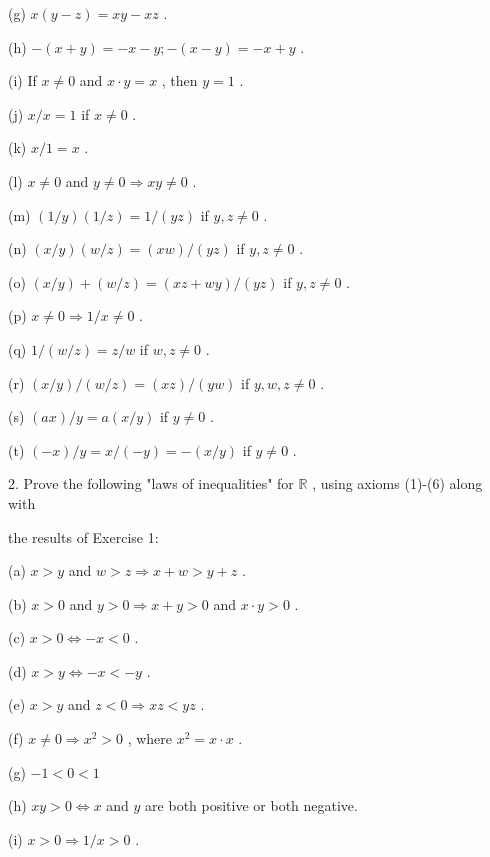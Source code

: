 (g) \(x\left( {y - z}\right)  = {xy} - {xz}\) .

(h) \(- \left( {x + y}\right)  =  - x - y; - \left( {x - y}\right)  =  - x + y\) .

(i) If \(x \neq  0\) and \(x \cdot  y = x\) , then \(y = 1\) .

(j) \(x/x = 1\) if \(x \neq  0\) .

(k) \(x/1 = x\) .

(l) \(x \neq  0\) and \(y \neq  0 \Rightarrow  {xy} \neq  0\) .

(m) \(\left( {1/y}\right) \left( {1/z}\right)  = 1/\left( {yz}\right)\) if \(y,z \neq  0\) .

(n) \(\left( {x/y}\right) \left( {w/z}\right)  = \left( {xw}\right) /\left( {yz}\right)\) if \(y,z \neq  0\) .

(o) \(\left( {x/y}\right)  + \left( {w/z}\right)  = \left( {{xz} + {wy}}\right) /\left( {yz}\right)\) if \(y,z \neq  0\) .

(p) \(x \neq  0 \Rightarrow  1/x \neq  0\) .

(q) \(1/\left( {w/z}\right)  = z/w\) if \(w,z \neq  0\) .

(r) \(\left( {x/y}\right) /\left( {w/z}\right)  = \left( {xz}\right) /\left( {yw}\right)\) if \(y,w,z \neq  0\) .

(s) \(\left( {ax}\right) /y = a\left( {x/y}\right)\) if \(y \neq  0\) .

(t) \(\left( {-x}\right) /y = x/\left( {-y}\right)  =  - \left( {x/y}\right)\) if \(y \neq  0\) .

2. Prove the following "laws of inequalities" for \(\mathbb{R}\) , using axioms (1)-(6) along with

the results of Exercise 1:

(a) \(x > y\) and \(w > z \Rightarrow  x + w > y + z\) .

(b) \(x > 0\) and \(y > 0 \Rightarrow  x + y > 0\) and \(x \cdot  y > 0\) .

(c) \(x > 0 \Leftrightarrow   - x < 0\) .

(d) \(x > y \Leftrightarrow   - x <  - y\) .

(e) \(x > y\) and \(z < 0 \Rightarrow  {xz} < {yz}\) .

(f) \(x \neq  0 \Rightarrow  {x}^{2} > 0\) , where \({x}^{2} = x \cdot  x\) .

(g) \(- 1 < 0 < 1\)

(h) \({xy} > 0 \Leftrightarrow  x\) and \(y\) are both positive or both negative.

(i) \(x > 0 \Rightarrow  1/x > 0\) .

